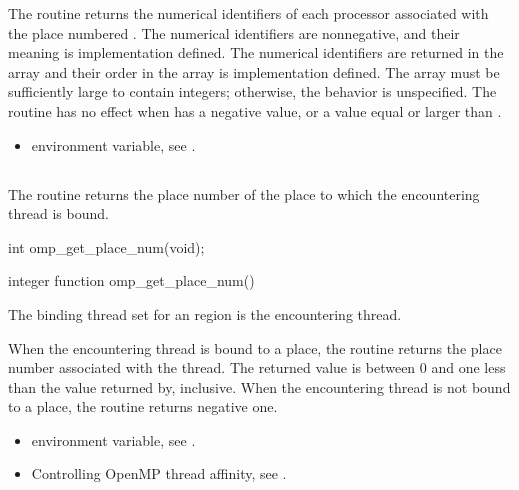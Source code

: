 \effect
The  routine returns the numerical 
identifiers of each processor associated with the place numbered 
. The numerical identifiers are nonnegative, and 
their meaning is implementation defined.  The numerical identifiers 
are returned in the array  and their order in the array is 
implementation defined. The array must be sufficiently large to contain 
 integers; otherwise, the 
behavior is unspecified.  The routine has no effect when 
 has a negative value, or a value equal or larger 
than .

\crossreferences
\begin{itemize}
\item {} environment variable, see 
.
\end{itemize}




\subsection{}
\label{subsec:omp_get_place_num}

\summary
The  routine returns the place number of the place to which the encountering thread is bound.

\format
\ccppspecificstart
\begin{boxedcode}
int omp\_get\_place\_num(void);
\end{boxedcode}
\ccppspecificend

\fortranspecificstart
\begin{boxedcode}
integer function omp\_get\_place\_num()
\end{boxedcode}
\fortranspecificend

\binding
The binding thread set for an  region is the encountering thread.

\effect
When the encountering thread is bound to a place, the 
 routine returns the place number associated 
with the thread. The returned value is between 0 and one less than the 
value returned by, inclusive. When the 
encountering thread is not bound to a place, the routine returns negative one.

\crossreferences
\begin{itemize}
\item {} environment variable, see 
.

\item Controlling OpenMP thread affinity, see 
. 
\end{itemize}





